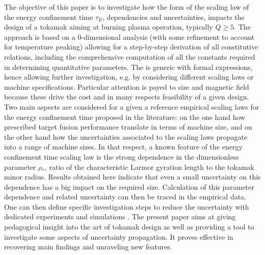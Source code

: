 \documentclass[12pt]{iopart}
\newcommand{\newstuff}[1]{\color{blue}{#1}\color{black}}
\begin{document}
The objective of this paper is to investigate how the form of the scaling law of the energy confinement time $\tau_E$, dependencies and uncertainties, impacts the design of a tokamak aiming at burning plasma operation, typically $Q \ge 5$. The approach is based on a 0-dimensional analysis (with some refinement to account for temperature peaking) allowing for a step-by-step derivation of all constitutive relations, including the comprehensive computation of all the constants required in determining quantitative parameters. The \newstuff{calculation } is generic with formal expressions, hence allowing further investigation, e.g. by considering different scaling laws or machine specifications. Particular attention is payed to size and magnetic field because these drive the cost and in many respects feasibility of a given design. Two main aspects are considered for a given a reference empirical scaling laws for the energy confinement time proposed in the literature: on the one hand how prescribed target fusion performance translate in terms of machine size, and on the other hand how the uncertainties associated to the scaling laws propagate into a range of machine sizes. In that respect, a known feature of the energy confinement time scaling law is the strong dependence in the dimensionless parameter $\rho_*$, ratio of the characteristic Larmor gyration length to the tokamak minor radius. Results obtained here indicate that even a small uncertainty on this dependence has a big impact on the required size. Calculation of this parameter dependence and related uncertainty can then be traced in the empirical data. One can then define specific investigation steps to reduce the uncertainty with dedicated experiments and simulations \cite{Caschera2019}. The present paper aims at giving pedagogical insight into the art of tokamak design as well as providing a tool to investigate some aspects of uncertainty propagation. It proves effective in recovering main findings and unraveling new features. \\
\end{document}
